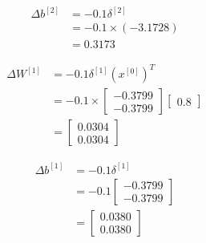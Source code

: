 \documentclass[12pt]{article}
\begin{document}
\begin{enumerate}[leftmargin=\labelsep]
\begin{paracol}{3}
\begin{footnotesize}
                  $$
                      \begin{aligned}
                          \Delta b^{[2]} & = -0.1 \delta^{[2]}     \\
                                         & = -0.1 \times (-3.1728) \\
                                         & = 0.3173
                      \end{aligned}
                  $$

                  $$
                      \begin{aligned}
                          \Delta W^{[1]} & = -0.1 \delta^{[1]} \left(x^{[0]}\right)^T \\
                                         & = -0.1 \times \begin{bmatrix}
                                                             -0.3799 \\
                                                             -0.3799
                                                         \end{bmatrix} \begin{bmatrix}
                                                                           0.8
                                                                       \end{bmatrix} \\
                                         & = \begin{bmatrix}
                                                 0.0304 \\
                                                 0.0304
                                             \end{bmatrix}
                      \end{aligned}
                  $$

                  $$
                      \begin{aligned}
                          \Delta b^{[1]} & = -0.1 \delta^{[1]}   \\
                                         & = -0.1 \begin{bmatrix}
                                                      -0.3799 \\
                                                      -0.3799
                                                  \end{bmatrix} \\
                                         & = \begin{bmatrix}
                                                 0.0380 \\
                                                 0.0380
                                             \end{bmatrix}
                      \end{aligned}
                  $$
              \end{footnotesize}


\end{paracol}
\end{enumerate}
\end{document}
